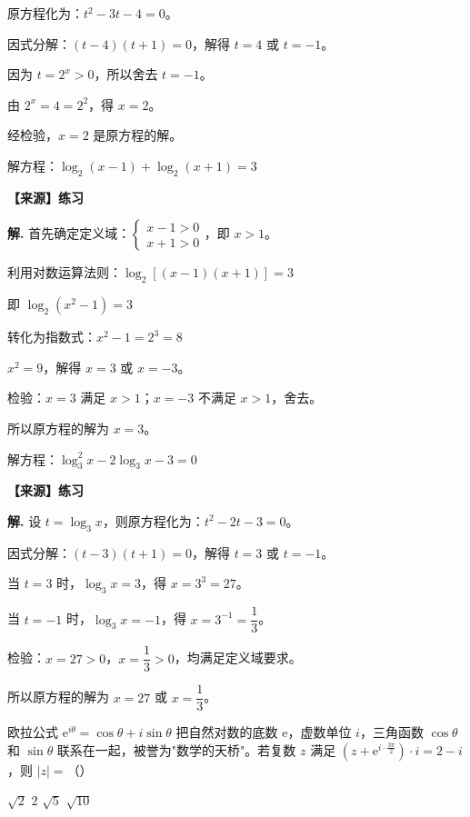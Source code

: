 \documentclass[11pt]{ctexrep}
\begin{document}
原方程化为：$t^2 - 3t - 4 = 0$。

因式分解：$(t-4)(t+1) = 0$，解得 $t = 4$ 或 $t = -1$。

因为 $t = 2^x > 0$，所以舍去 $t = -1$。

由 $2^x = 4 = 2^2$，得 $x = 2$。

经检验，$x = 2$ 是原方程的解。

\begin{example}[基本对数方程]
    解方程：$\log_2(x-1) + \log_2(x+1) = 3$
    
    \textbf{【来源】练习}
\end{example}

\textbf{解.} 首先确定定义域：$\begin{cases} x - 1 > 0 \\ x + 1 > 0 \end{cases}$，即 $x > 1$。

利用对数运算法则：$\log_2[(x-1)(x+1)] = 3$

即 $\log_2(x^2-1) = 3$

转化为指数式：$x^2 - 1 = 2^3 = 8$

$x^2 = 9$，解得 $x = 3$ 或 $x = -3$。

检验：$x = 3$ 满足 $x > 1$；$x = -3$ 不满足 $x > 1$，舍去。

所以原方程的解为 $x = 3$。

\begin{example}[可化为二次型的对数方程]
    解方程：$\log_3^2 x - 2\log_3 x - 3 = 0$
    
    \textbf{【来源】练习}
\end{example}

\textbf{解.} 设 $t = \log_3 x$，则原方程化为：$t^2 - 2t - 3 = 0$。

因式分解：$(t-3)(t+1) = 0$，解得 $t = 3$ 或 $t = -1$。

当 $t = 3$ 时，$\log_3 x = 3$，得 $x = 3^3 = 27$。

当 $t = -1$ 时，$\log_3 x = -1$，得 $x = 3^{-1} = \dfrac{1}{3}$。

检验：$x = 27 > 0$，$x = \dfrac{1}{3} > 0$，均满足定义域要求。

所以原方程的解为 $x = 27$ 或 $x = \dfrac{1}{3}$。

\begin{realexam}[2024 上海虹口二模]
    欧拉公式 $\mathrm{e}^{i\theta} = \cos\theta + i\sin\theta$ 把自然对数的底数 $\mathrm{e}$，虚数单位 $i$，三角函数 $\cos\theta$ 和 $\sin\theta$ 联系在一起，被誉为"数学的天桥"。若复数 $z$ 满足 $\left(z + \mathrm{e}^{i \cdot \frac{3\pi}{2}}\right) \cdot i = 2 - i$，则 $|z| =$（\quad）

     $\sqrt{2}$ \quad {} $2$ \quad {} $\sqrt{5}$ \quad {} $\sqrt{10}$
\end{realexam}
\end{document}
